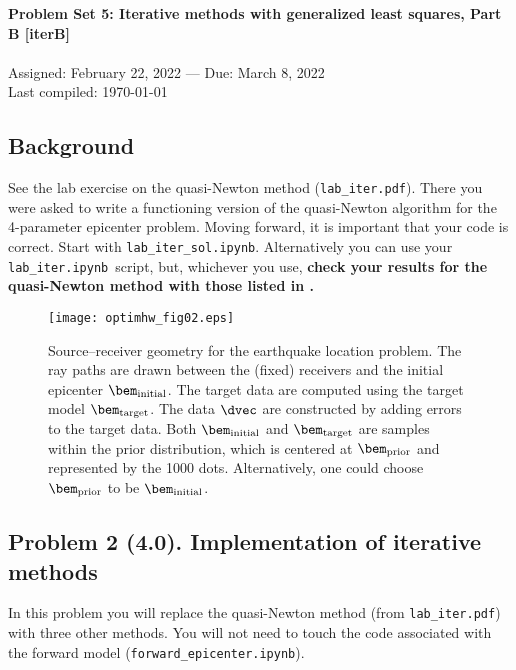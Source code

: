 \documentclass[11pt,titlepage,fleqn]{article}
\newcommand{\tfile}{{\tt lab\_iter.ipynb}}
\newcommand{\tfileFE}{{\tt forward\_epicenter.ipynb}}
\begin{document}
 

\begin{spacing}{1.2}
\centering
{\large \bf Problem Set 5: Iterative methods with generalized least squares, Part B [iterB]} \\
\cltag\ \\
Assigned: February 22, 2022 --- Due: March 8, 2022 \\
Last compiled: \today
\end{spacing}


\subsection*{Background}

See the lab exercise on the quasi-Newton method (\verb+lab_iter.pdf+). There you were asked to write a functioning version of the quasi-Newton algorithm for the 4-parameter epicenter problem. Moving forward, it is important that your code is correct. Start with \verb+lab_iter_sol.ipynb+.
%
Alternatively you can use your \tfile\ script, but, whichever you use, {\bf check your results for the quasi-Newton method with those listed in .}

\vspace{0.5cm}
\begin{figure}[h]
\centering
\texttt{[image: optimhw\_fig02.eps]}
\caption[Source-receiver geometry]
{{
Source--receiver geometry for the earthquake location problem. The ray paths are drawn between the (fixed) receivers and the initial epicenter $\bem_{\rm initial}$.
The target data are computed using the target model \textcolor{red}{$\bem_{\rm target}$}.
The data $\dvec$ are constructed by adding errors to the target data.
Both $\bem_{\rm initial}$ and $\bem_{\rm target}$ are samples within the prior distribution, which is centered at \textcolor{blue}{$\bem_{\rm prior}$} and represented by the 1000 dots. Alternatively, one could choose \textcolor{blue}{$\bem_{\rm prior}$} to be $\bem_{\rm initial}$.
\label{fig:srcrec}
}}
\end{figure}

\clearpage\pagebreak
\subsection*{Problem 2 (4.0). Implementation of iterative methods}

In this problem you will replace the quasi-Newton method (from \verb+lab_iter.pdf+) with three other methods. You will not need to touch the code associated with the forward model (\tfileFE).
\end{document}
